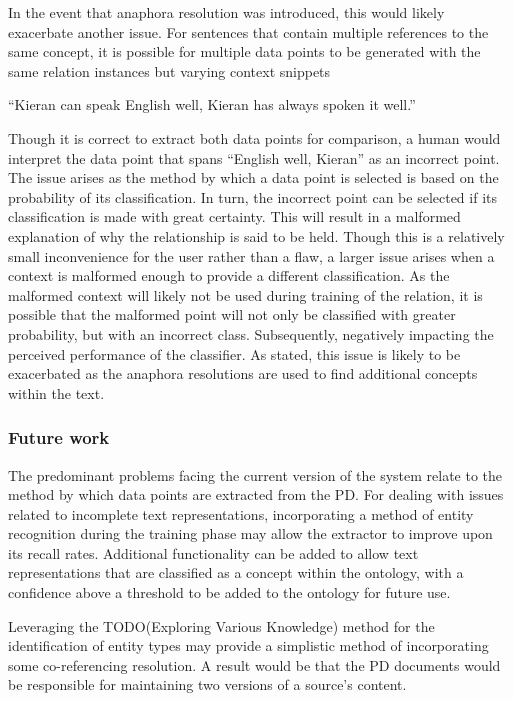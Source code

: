 \documentclass[11pt]{article} %
\begin{document}
In the event that anaphora resolution was introduced, this would likely exacerbate another issue. For sentences that contain multiple references to the same concept, it is possible for multiple data points to be generated with the same relation instances but varying context snippets

“Kieran can speak English well, Kieran has always spoken it well.”

Though it is correct to extract both data points for comparison, a human would interpret the data point that spans “English well, Kieran” as an incorrect point. The issue arises as the method by which a data point is selected is based on the probability of its classification. In turn, the incorrect point can be selected if its classification is made with great certainty. This will result in a malformed explanation of why the relationship is said to be held. Though this is a relatively small inconvenience for the user rather than a flaw, a larger issue arises when a context is malformed enough to provide a different classification. As the malformed context will likely not be used during training of the relation, it is possible that the malformed point will not only be classified with greater probability, but with an incorrect class. Subsequently, negatively impacting the perceived performance of the classifier. As stated, this issue is likely to be exacerbated as the anaphora resolutions are used to find additional concepts within the text.


\subsubsection{Future work}

The predominant problems facing the current version of the system relate to the method by which data points are extracted from the PD. For dealing with issues related to incomplete text representations, incorporating a method of entity recognition during the training phase may allow the extractor to improve upon its recall rates. Additional functionality can be added to allow text representations that are classified as a concept within the ontology, with a confidence above a threshold to be added to the ontology for future use.

Leveraging the TODO(Exploring Various Knowledge) method for the identification of entity types may provide a simplistic method of incorporating some co-referencing resolution. A result would be that the PD documents would be responsible for maintaining two versions of a source's content.
\end{document}

